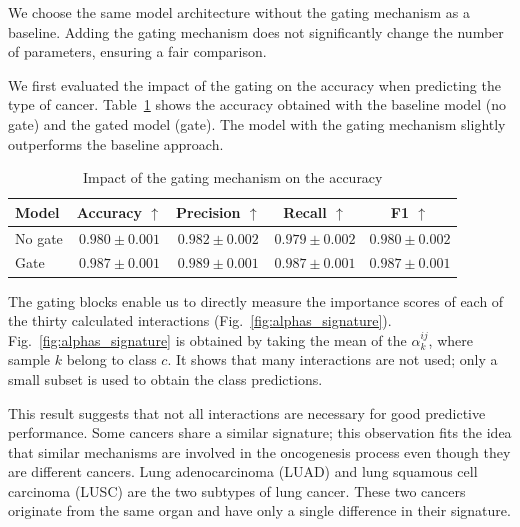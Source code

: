 \documentclass[../main.tex]{subfiles}
\begin{document}
     We choose the same model architecture without the gating mechanism as a baseline.
     Adding the gating mechanism does not significantly change the number of parameters, ensuring a fair comparison.

     We first evaluated the impact of the gating on the accuracy when predicting the type of cancer.
     Table~\ref{tab:base_table} shows the accuracy obtained with the baseline model (no gate) and the gated model (gate).
     The model with the gating mechanism slightly outperforms the baseline approach.

     \begin{table}[htbp]
         \centering
         \caption{Impact of the gating mechanism on the accuracy}
         \begin{tabular}{lcccc}
             \toprule
             Model   & Accuracy \(\uparrow\) & Precision \(\uparrow\) & Recall \(\uparrow\) & F1 \(\uparrow\)   \\
             \midrule
             No gate & $0.980 \pm 0.001$     & $0.982 \pm 0.002$      & $0.979 \pm 0.002$   & $0.980 \pm 0.002$ \\
             Gate    & $0.987 \pm 0.001$     & $0.989 \pm 0.001$      & $0.987 \pm 0.001$   & $0.987 \pm 0.001$ \\
             \bottomrule
         \end{tabular}
         \label{tab:base_table}
     \end{table}

     The gating blocks enable us to directly measure the importance scores of each of the thirty calculated interactions (Fig.~\ref{fig:alphas_signature}).
     Fig.~\ref{fig:alphas_signature} is obtained by taking the mean of the \(\alpha^{ij}_k\), where sample \(k\) belong to class \(c\).
     It shows that many interactions are not used; only a small subset is used to obtain the class predictions.

     This result suggests that not all interactions are necessary for good predictive performance.
     Some cancers share a similar signature; this observation fits the idea that similar mechanisms are involved in the oncogenesis process even though they are different cancers.
     Lung adenocarcinoma (LUAD) and lung squamous cell carcinoma (LUSC) are the two subtypes of lung cancer.
     These two cancers originate from the same organ and have only a single difference in their signature.
\end{document}
